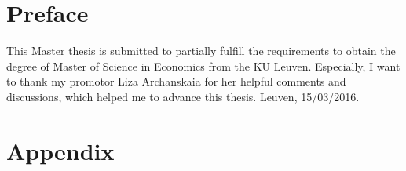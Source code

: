 \documentclass[11pt,leqno,a4paper]{scrbook}
\begin{document}
\setcounter{tocdepth}{1}



\setcounter{equation}{1}
\pagestyle{empty}

\clearpage

\chapter*{Preface\hfill} 

\begin{flushright}
This Master thesis  is submitted to partially fulfill the requirements to obtain the degree of Master of Science in
Economics from the KU Leuven. Especially,  I want to thank my promotor Liza Archanskaia for her helpful comments and discussions, which helped me to advance this thesis. %
Leuven, 15/03/2016.
\end{flushright}


\mainmatter

\pagestyle{headings}


%






\clearpage
\printbibliography
\vfill
\pagestyle{empty}
\appendix
{}


\tocless \chapter{Appendix}

\clearpage
\newpage
\thispagestyle{empty}

\end{document}
